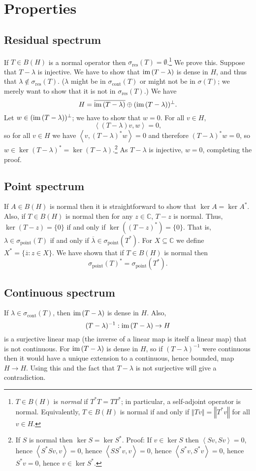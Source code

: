 \documentclass{article}
\newcommand{\inner}[2]{\left\langle #1, #2 \right\rangle}
\newcommand{\im}{\textrm{im\,}}
\newcommand{\point}{\sigma_{\textrm{point}}}
\newcommand{\cont}{\sigma_{\textrm{cont}}}
\newcommand{\residual}{\sigma_{\textrm{res}}}
\newcommand{\norm}[1]{\left\Vert #1 \right\Vert}
\begin{document}
\section{Properties}
\label{properties}
\subsection{Residual spectrum}
If $T \in B(H)$ is a normal operator then $\residual(T) = \emptyset$.\footnote{$T \in B(H)$ is {\em normal} if
$T^*T=TT^*$; in particular, a self-adjoint operator is normal. Equivalently, $T \in B(H)$ is normal if and only if
$\norm{Tv}=\norm{T^*v}$ for all $v \in H$.} We prove this. Suppose that
$T-\lambda$ is injective. We have to show that $\im (T-\lambda)$ is dense in $H$, and thus that $\lambda \not \in
\residual(T)$. ($\lambda$ might be in $\cont(T)$ or might not be in $\sigma(T)$;  we merely want to show that it is not
in $\residual(T)$.) We have
\[
H=\overline{ \im(T-\lambda)} \oplus (\im(T-\lambda))^\perp.
\]
Let $w \in (\im(T-\lambda))^\perp$; we have to show that $w=0$. For all $v \in H$,
\[
\inner{(T-\lambda)v}{w}=0,
\]
so for all $v \in H$ we have $\inner{v}{(T-\lambda)^*w}=0$ and therefore
$(T-\lambda)^*w=0$, so $w \in \ker (T-\lambda)^*=\ker(T-\lambda)$.\footnote{If $S$ is normal then
$\ker S=\ker S^*$. Proof: If $v \in \ker S$ then $\inner{Sv}{Sv}=0$, hence $\inner{S^*Sv}{v}=0$, hence
$\inner{SS^*v}{v}=0$, hence $\inner{S^*v}{S^*v}=0$, hence $S^*v=0$, hence $v \in \ker S^*$.}
 As $T-\lambda$ is injective, $w=0$, completing the proof.

\subsection{Point spectrum}
If $A \in B(H)$ is normal then it is straightforward to show
that $\ker A=\ker A^*$. Also, if $T \in B(H)$ is normal then for any $z \in \mathbb{C}$, $T-z$ is normal.
Thus, $\ker (T-z) = \{0\}$ if and only if $\ker ((T-z)^*)=\{0\}$. That is, $\lambda \in \point(T)$ if and only
if $\overline{\lambda} \in \point(T^*)$. 
For $X \subseteq \mathbb{C}$ we define
$X^*=\{\overline{z}:z \in X\}$. We have shown that if $T \in B(H)$ is normal then
\[
\point(T)^* = \point(T^*).
\]


\subsection{Continuous spectrum}
If $\lambda \in \cont(T)$, then $\im(T-\lambda)$ is dense in $H$. Also,
\[
(T-\lambda)^{-1}:\im(T-\lambda) \to H
\]
is a surjective linear map (the inverse of a linear map is itself a linear map) that is not continuous. For $\im(T-\lambda)$ is dense in $H$,
so if $(T-\lambda)^{-1}$ were continuous then it would
have a unique extension to a continuous, hence bounded, map $H \to H$. Using this and the fact that
$T-\lambda$ is not surjective will give a contradiction.
\end{document}
